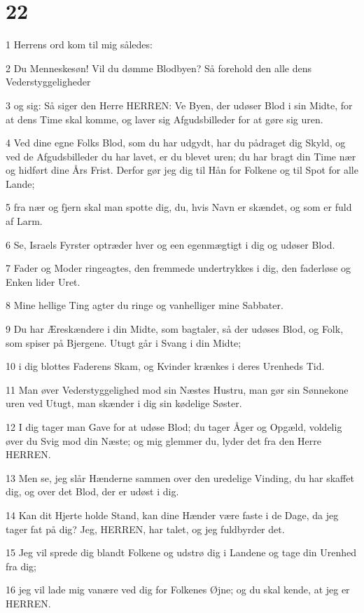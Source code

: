 \chapter{22}

\par 1 Herrens ord kom til mig således:
\par 2 Du Menneskesøn! Vil du dømme Blodbyen? Så forehold den alle dens Vederstyggeligheder
\par 3 og sig: Så siger den Herre HERREN: Ve Byen, der udøser Blod i sin Midte, for at dens Time skal komme, og laver sig Afgudsbilleder for at gøre sig uren.
\par 4 Ved dine egne Folks Blod, som du har udgydt, har du pådraget dig Skyld, og ved de Afgudsbilleder du har lavet, er du blevet uren; du har bragt din Time nær og hidført dine Års Frist. Derfor gør jeg dig til Hån for Folkene og til Spot for alle Lande;
\par 5 fra nær og fjern skal man spotte dig, du, hvis Navn er skændet, og som er fuld af Larm.
\par 6 Se, Israels Fyrster optræder hver og een egenmægtigt i dig og udøser Blod.
\par 7 Fader og Moder ringeagtes, den fremmede undertrykkes i dig, den faderløse og Enken lider Uret.
\par 8 Mine hellige Ting agter du ringe og vanhelliger mine Sabbater.
\par 9 Du har Æreskændere i din Midte, som bagtaler, så der udøses Blod, og Folk, som spiser på Bjergene. Utugt går i Svang i din Midte;
\par 10 i dig blottes Faderens Skam, og Kvinder krænkes i deres Urenheds Tid.
\par 11 Man øver Vederstyggelighed mod sin Næstes Hustru, man gør sin Sønnekone uren ved Utugt, man skænder i dig sin kødelige Søster.
\par 12 I dig tager man Gave for at udøse Blod; du tager Åger og Opgæld, voldelig øver du Svig mod din Næste; og mig glemmer du, lyder det fra den Herre HERREN.
\par 13 Men se, jeg slår Hænderne sammen over den uredelige Vinding, du har skaffet dig, og over det Blod, der er udøst i dig.
\par 14 Kan dit Hjerte holde Stand, kan dine Hænder være faste i de Dage, da jeg tager fat på dig? Jeg, HERREN, har talet, og jeg fuldbyrder det.
\par 15 Jeg vil sprede dig blandt Folkene og udstrø dig i Landene og tage din Urenhed fra dig;
\par 16 jeg vil lade mig vanære ved dig for Folkenes Øjne; og du skal kende, at jeg er HERREN.
